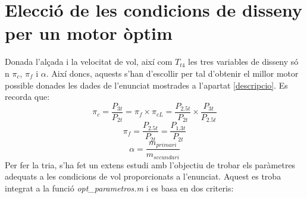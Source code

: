 \section{Elecció de les condicions de disseny per un motor òptim}
Donada l'alçada i la velocitat de vol, així com $T_{t4}$ les tres variables de disseny só	n $\pi_c$, $\pi_f$ i $\alpha$. Així doncs, aquests s'han d'escollir per tal d'obtenir el millor motor possible donades les dades de l'enunciat mostrades a l'apartat \ref{descripcio}.
Es recorda que:
\begin{equation*}
	\pi_c = \frac{P_{3t}}{P_{2t}} = \pi_{f}\times\pi_{cL} = \frac{P_{2.5t}}{P_{2t}} \times \frac{P_{3t}}{P_{2.5t}}
\end{equation*}
\begin{equation*}
	\pi_f = \frac{P_{2.5t}}{P_{2t}} = \frac{P_{1.3t}}{P_{2t}} 
\end{equation*}
\begin{equation*}
	\alpha = \frac{m_{primari}}{m_{secundari}}
\end{equation*}
Per fer la tria,  s'ha fet un extens estudi amb l'objectiu de trobar els paràmetres adequats a les condicions de vol proporcionats a l'enunciat. Aquest es troba integrat a la funció \textit{opt\_parametros.m} i es basa en dos criteris:
